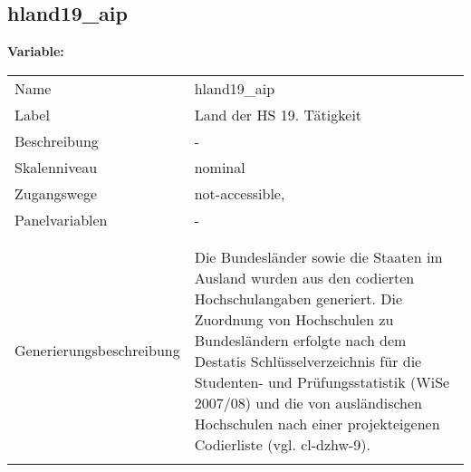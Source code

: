	
	
	\subsection{hland19\_aip}
	\label{subSection:hland19_aip}

	\noindent\textbf{Variable:}\\
		\begin{tabular}{lL{11.3cm}}
			\label{tableVariable:hland19_aip}
			Name & hland19\_aip \\
			Label & Land der HS 19. Tätigkeit \\
			Beschreibung & - \\
			Skalenniveau & nominal \\
			Zugangswege &
				not-accessible,
 \\
			Panelvariablen & -
			 \\
			 \\
 \\
					Generierungsbeschreibung & Die Bundesländer sowie die Staaten im Ausland wurden aus den codierten Hochschulangaben generiert. Die Zuordnung von Hochschulen zu Bundesländern erfolgte nach dem Destatis Schlüsselverzeichnis für die Studenten- und Prüfungsstatistik (WiSe 2007/08) und die von ausländischen Hochschulen nach einer projekteigenen Codierliste (vgl. cl-dzhw-9).
				 \\	
			 \\
		\end{tabular}






	
	\newpage
